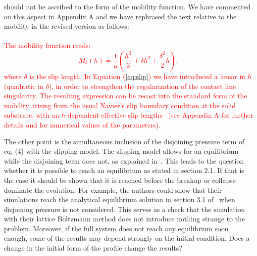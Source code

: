 \documentclass[12pt,english]{article}
\begin{document}
\begin{itemize}
{{should not be ascribed to the form of the mobility function.
We have commented on this aspect in Appendix A and we have rephrased the text relative to the mobility in the revised version as follows:\\
\\
\textcolor{red}{The mobility function reads:
\begin{equation}\label{eq:slip}
M_{\delta}(h) = \frac{1}{\mu}\left(\frac{h^3}{3} + \delta h^2 +\frac{\delta^2}{2} h\right),
\end{equation}
where $\delta$ is the slip length. In Equation (\ref{eq:slip}) we have introduced a linear in $h$
(quadratic in $\delta$), in order to strengthen the regularization of the contact line singularity.  
The resulting expression can be recast into the standard form of the mobility
arising from the usual Navier's slip boundary condition at the solid substrate, with an $h$-dependent 
effective slip lengths~\cite{Haley_Miksis_1991,Greenspan1978} (see Appendix A for further details and for numerical values of the parameters).
}
}

\item[ \textbf{\underline{Comment 2.}}]
The other point is the simultaneous inclusion of the disjoining pressure term of eq. (4) with the slipping model. The slipping model allows for an equilibrium while the disjoining term does not, as explained in~\cite{gonzalezStabilityLiquidRing2013}. This leads to the question whether it is possible to reach an equilibrium as stated in section 2.1. If that is the case it should be shown that it is reached before the breakup or collapse dominate the evolution. For example, the authors could show that their simulations reach the analytical equilibrium solution in section 3.1 of~\cite{gonzalezStabilityLiquidRing2013} when disjoining pressure is not considered. This serves as a check that the simulation with their lattice Boltzmann method does not introduce nothing strange to the problem. Moreover, if the full system does not reach any equilibrium soon enough, some of the results may depend strongly on the initial condition. Does a change in the initial form of the profile change the results?
}


\end{itemize}
\end{document}
